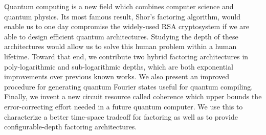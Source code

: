 Quantum computing is a new field which combines
computer science and quantum physics. Its most
famous result, Shor's factoring algorithm,
would enable us to one day compromise the widely-used
RSA cryptosystem if we are able to
design efficient quantum architectures. Studying
the depth of these architectures would allow us
to solve this human problem within a human
lifetime. Toward that end, we contribute two
hybrid factoring architectures in
poly-logarithmic and sub-logarithmic depths,
which are both exponential improvements over previous
known works. We also present an improved
procedure for generating quantum Fourier states
useful for quantum compiling. Finally, we
invent a new circuit resource called coherence
which upper bounds the error-correcting effort
needed in a future quantum computer. We use this
to characterize a better time-space tradeoff
for factoring as well as to provide
configurable-depth factoring architectures.